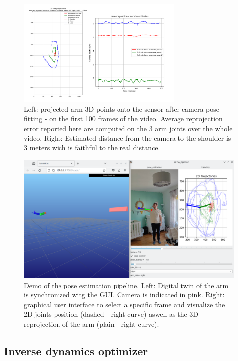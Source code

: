 \begin{figure}
    \centering
    \includegraphics[width=8cm]{figures/camera_pose_fitting_collage.png}
    \caption{Left: projected arm 3D points onto the sensor after camera pose fitting - on the first 100 frames of the video. Average reprojection error reported here are computed on the 3 arm joints over the whole video.
    Right: Estimated distance from the camera to the shoulder is 3 meters wich is faithful to the real distance.}
    \label{fig:camera_fitting}
\end{figure}

\begin{figure}
    \centering
    \includegraphics[width=16cm]{figures/arm_demo.png}
    \caption{Demo of the pose estimation pipeline.
    Left: Digital twin of the arm is synchronized witg the GUI. Camera is indicated in pink.
    Right: graphical user interface to select a specific frame
    and visualize the 2D joints position (dashed - right curve) aswell as the 3D reprojection of the arm (plain - right curve).}
    \label{fig:demo}
\end{figure}

\subsection{Inverse dynamics optimizer}
\label{subsec:inverse_dynamics}

